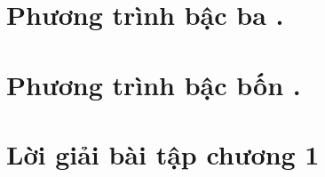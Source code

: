\section{Phương trình bậc ba .}

\section{Phương trình bậc bốn .}
\section*{Lời giải bài tập chương 1}
{\small}
